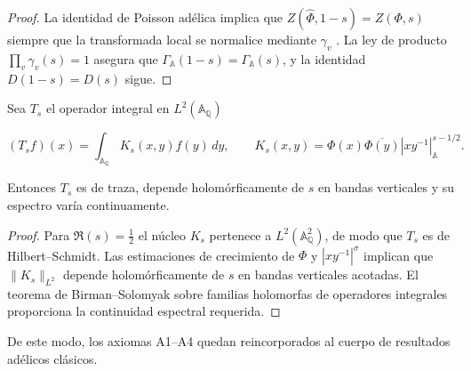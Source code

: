 \begin{proof}
La identidad de Poisson adélica
\cite[Thm.~2]{Tate1967}
implica que $Z(\widehat{\Phi},1-s)=Z(\Phi,s)$ siempre que la transformada local se
normalice mediante $\gamma_v$ \cite[§II.3]{Weil1964}.  La ley de producto
$\prod_v\gamma_v(s)=1$ asegura que $\Gamma_{\mathbb{A}}(1-s)=\Gamma_{\mathbb{A}}(s)$, y la
identidad $D(1-s)=D(s)$ sigue.
\end{proof}

\begin{lemma}\label{lem:A4-paper}
Sea $T_s$ el operador integral en $L^2(\mathbb{A}_\mathbb{Q})$

\[
  (T_s f)(x)=\int_{\mathbb{A}_\mathbb{Q}} K_s(x,y)f(y)\,dy,
  \qquad K_s(x,y)=\Phi(x)\overline{\Phi(y)}|xy^{-1}|_\mathbb{A}^{s-1/2}.
\]

Entonces $T_s$ es de traza, depende holomórficamente de $s$ en bandas verticales
y su espectro varía continuamente.
\end{lemma}

\begin{proof}
Para $\Re(s)=\tfrac{1}{2}$ el núcleo $K_s$ pertenece a $L^2(\mathbb{A}_\mathbb{Q}^2)$, de
modo que $T_s$ es de Hilbert--Schmidt.  Las estimaciones de crecimiento de $\Phi$
y $|xy^{-1}|^{\sigma}$ implican que $\|K_s\|_{L^2}$ depende holomórficamente de $s$
en bandas verticales acotadas.  El teorema de Birman--Solomyak sobre
familias holomorfas de operadores integrales
\cite[Thm.~1]{BirmanSolomyak1967}
proporciona la continuidad espectral requerida.
\end{proof}

De este modo, los axiomas A1--A4 quedan reincorporados al cuerpo de resultados
adélicos clásicos.

